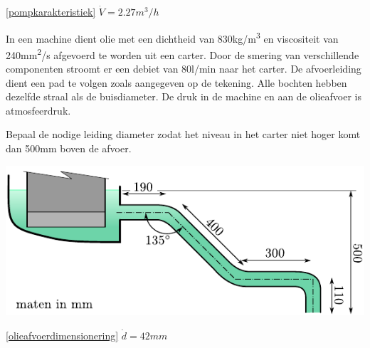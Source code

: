 \begin{antwoord}{\ref{pompkarakteristiek}}
	$\dot{V} = 2.27\unit{m^3/h}$
\end{antwoord}
\begin{toepassing}[*]
	\label{olieafvoerdimensionering}
In een machine dient olie met een dichtheid van 830\unit{kg/m^3} en viscositeit van 240\unit{mm^2/s} afgevoerd te worden uit een carter. Door de smering van verschillende componenten stroomt er een debiet van 80l/min naar het carter. De afvoerleiding dient een pad te volgen zoals aangegeven op de tekening. Alle bochten hebben dezelfde straal als de buisdiameter. De druk in de machine en aan de olieafvoer is atmosfeerdruk.
	
Bepaal de nodige leiding diameter zodat het niveau in het carter niet hoger komt dan 500mm boven de afvoer.

	\centering
	\includegraphics{fig/stroming_in_leidingen/olieafvoerdimensionering}
\end{toepassing}
\begin{antwoord}{\ref{olieafvoerdimensionering}}
	$\dot{d} = 42\unit{mm}$
\end{antwoord}
